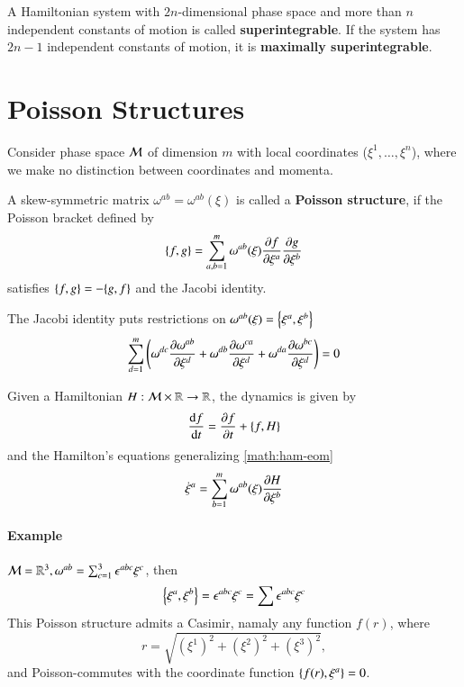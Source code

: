 \begin{definition}
	A Hamiltonian system with $2n$-dimensional phase space and more than $n$ independent constants of motion is called \textbf{superintegrable}. If the system has $2n-1$ independent constants of motion, it is \textbf{maximally superintegrable}.
\end{definition}

\section{Poisson Structures}
Consider phase space $\mathcal{M}$ of dimension $m$ with local coordinates ($\xi^1, \dots, \xi^n$), where we make no distinction between coordinates and momenta.

\begin{definition}
	A skew-symmetric matrix $\omega^{ab} = \omega^{ab} (\xi)$	 is called a \textbf{Poisson structure}, if the Poisson bracket defined by 
	\begin{equation*}
		\pb{f}{g} =  \sum_{a, b = 1}^m \omega^{ab} (\xi) \pdv{f}{\xi^a} \pdv{g}{\xi^b}
	\end{equation*}
satisfies  $\pb{f}{g} = - \pb{g}{f}$ and the Jacobi identity.
\end{definition}
The Jacobi identity puts restrictions on $\omega^{ab}(\xi) = \pb{\xi^a}{\xi^b}$
\begin{align*}
	\sum_{d=1}^{m} \left( \omega^{dc} \pdv{\omega^{ab}}{\xi^d} + \omega^{db} \pdv{\omega^{ca}}{\xi^d} + \omega^{da} \pdv{\omega^{bc}}{\xi^d} \right) 	 = 0
\end{align*}

Given a Hamiltonian $H: \mathcal{M} \times \mathbb{R} \rightarrow \mathbb{R}$, the dynamics is given by
\begin{equation*}
	\dv{f}{t} = \pdv{f}{t} + \pb{f}{H}
\end{equation*}
and the Hamilton's equations generalizing \eqref{math:ham-eom} 
\begin{equation*}
	\dot{\xi}^a = \sum_{b=1}^m \omega^{ab}(\xi) \pdv{H}{\xi^b}
\end{equation*}

\paragraph{Example}
$\mathcal{M} = \mathbb{R}^3, \omega^{ab} = \sum_{c=1}^{3} \epsilon^{abc} \xi^c$, then
\begin{equation*}
	\pb{\xi^a}{\xi^b} = \epsilon^{abc} \xi^c = \sum \epsilon^{abc} \xi^c
\end{equation*}
This Poisson structure admits a Casimir, namaly any function $f(r)$, where
\begin{equation*}
	r = \sqrt{(\xi^1)^2 + (\xi^2)^2 + (\xi^3)^2},
\end{equation*}
and Poisson-commutes with the coordinate function $\pb{f(r)}{\xi^a}=0$.

